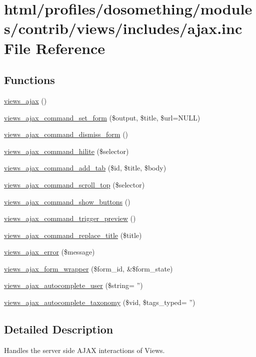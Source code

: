 \hypertarget{profiles_2dosomething_2modules_2contrib_2views_2includes_2ajax_8inc}{
\section{html/profiles/dosomething/modules/contrib/views/includes/ajax.inc File Reference}
\label{profiles_2dosomething_2modules_2contrib_2views_2includes_2ajax_8inc}
}
\subsection*{Functions}
\begin{DoxyCompactItemize}
\item 
\hyperlink{group__ajax_ga5f1adff7f07ea45d8ab62b456ffdd6e0}{views\_\-ajax} ()
\item 
\hyperlink{group__ajax_gac5062864272f5b8134072eb22a661e6f}{views\_\-ajax\_\-command\_\-set\_\-form} (\$output, \$title, \$url=NULL)
\item 
\hyperlink{group__ajax_gac0331ece9a64afe1350f116b9c5a79f1}{views\_\-ajax\_\-command\_\-dismiss\_\-form} ()
\item 
\hyperlink{group__ajax_ga22d27c9ab6b8a95f4903463eb6aabf8d}{views\_\-ajax\_\-command\_\-hilite} (\$selector)
\item 
\hyperlink{group__ajax_ga9e55776de616656e252b0f9eb8851e82}{views\_\-ajax\_\-command\_\-add\_\-tab} (\$id, \$title, \$body)
\item 
\hyperlink{group__ajax_gac7d8055fd4e9c91501496391dbe94b5a}{views\_\-ajax\_\-command\_\-scroll\_\-top} (\$selector)
\item 
\hyperlink{group__ajax_ga3ef672bfe39df163a3cf89ed23c8a0c2}{views\_\-ajax\_\-command\_\-show\_\-buttons} ()
\item 
\hyperlink{group__ajax_ga698e1518b153b16adbe61e3aeb376eac}{views\_\-ajax\_\-command\_\-trigger\_\-preview} ()
\item 
\hyperlink{group__ajax_ga42db219284fd40096900731ee6d13600}{views\_\-ajax\_\-command\_\-replace\_\-title} (\$title)
\item 
\hyperlink{group__ajax_ga59f31023b894be21852b7034f639523f}{views\_\-ajax\_\-error} (\$message)
\item 
\hyperlink{group__ajax_ga7eed0d665d7b4c8c8134eb060afbb2be}{views\_\-ajax\_\-form\_\-wrapper} (\$form\_\-id, \&\$form\_\-state)
\item 
\hyperlink{group__ajax_ga0d9404f1a04f9f5102ffac0bef92d5ab}{views\_\-ajax\_\-autocomplete\_\-user} (\$string= '')
\item 
\hyperlink{group__ajax_ga4aed960e2ee6b6e516e609188852c0f6}{views\_\-ajax\_\-autocomplete\_\-taxonomy} (\$vid, \$tags\_\-typed= '')
\end{DoxyCompactItemize}


\subsection{Detailed Description}
Handles the server side AJAX interactions of Views. 